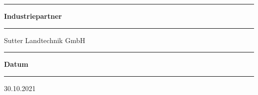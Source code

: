 \begin{titlepage}
\begin{minipage}[b]{0.84\textwidth}
	\begin{minipage}[b]{0.27\textwidth}
	\hrule\vskip 0.5cm
		\textbf{Industriepartner}\\
	\end{minipage}
	\begin{minipage}[b]{0.03\textwidth}
	\hskip 0.5cm
	\end{minipage}
	\begin{minipage}[b]{0.7\textwidth}
	\hrule\vskip 0.5cm
		Sutter Landtechnik GmbH \\
	\end{minipage}

	
	\begin{minipage}[b]{0.27\textwidth}
	\hrule\vskip 0.5cm
		\textbf{Datum}
	\end{minipage}
	\begin{minipage}[b]{0.03\textwidth}
	\hskip 0.5cm
	\end{minipage}
	\begin{minipage}[b]{0.7\textwidth}
	\hrule\vskip 0.5cm
		30.10.2021
	\end{minipage}
\end{minipage}
\vskip 0.5cm


\end{titlepage}
